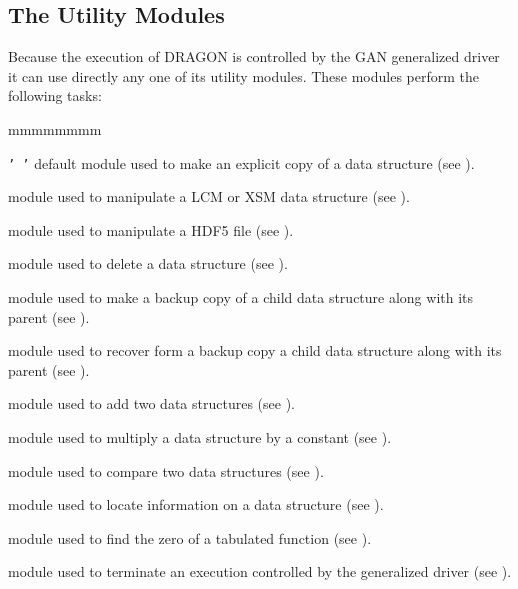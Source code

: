 \subsection{The Utility Modules}\label{sect:UtilityModules}

Because the execution of DRAGON is controlled by the GAN generalized driver it
can use directly any one of its utility modules. These modules perform the
following tasks:
 
\begin{ListeDeDescription}{mmmmmmmm}

\item[{\tt '~'}]  default module used to make an explicit copy of a data
structure (see ).

\item[\moc{UTL:}]  module used to manipulate a LCM or XSM data structure (see
).

\item[\moc{HUTL:}]  module used to manipulate a HDF5 file (see
).

\item[\moc{DELETE:}] module used to delete a data structure (see
).

\item[\moc{BACKUP:}] module used to make a backup copy of a child data
structure along with its parent (see
).

\item[\moc{RECOVER:}] module used to recover form a backup copy a child data
structure along with its parent (see ).

\item[\moc{ADD:}] module used to add two data
structures (see ).

\item[\moc{MPX:}] module used to multiply a data
structure by a constant (see ).

\item[\moc{STAT:}] module used to compare two data
structures (see ).

\item[\moc{GREP:}] module used to locate information on a data
structure (see ).

\item[\moc{FIND0:}] module used to find the zero of a tabulated function (see
).

\item[\moc{END:}] module used to terminate an execution controlled by the
generalized driver (see ).

\end{ListeDeDescription}

